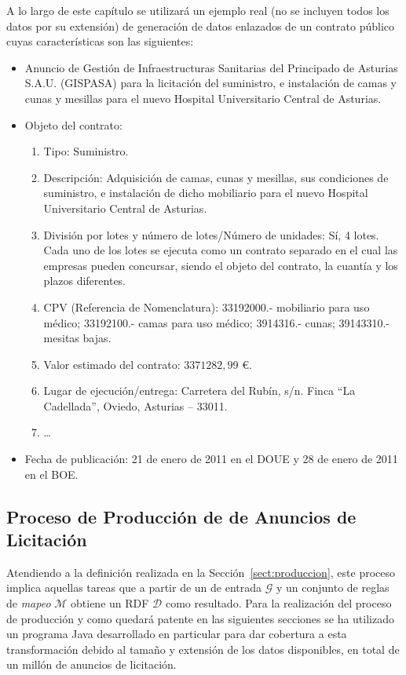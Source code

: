 A lo largo de este capítulo se utilizará un ejemplo real (no se incluyen todos los datos por su extensión) de generación de datos enlazados 
de un contrato público cuyas características son las siguientes:
\begin{itemize}
 \item Anuncio de Gestión de Infraestructuras Sanitarias del Principado de Asturias S.A.U. (GISPASA) para la licitación del suministro, e
instalación de camas y cunas y mesillas para el nuevo Hospital Universitario Central de Asturias.
\item Objeto del contrato:
\begin{enumerate}
 \item Tipo: Suministro.
 \item Descripción: Adquisición de camas, cunas y mesillas, sus condiciones de
suministro, e instalación de dicho mobiliario para el nuevo Hospital
Universitario Central de Asturias.
 \item División por lotes y número de lotes/Número de unidades: Sí, 4 lotes. Cada uno de los lotes se ejecuta 
como un contrato separado en el cual las empresas pueden concursar, siendo el objeto del contrato, la cuantía 
y los plazos diferentes.
 \item  CPV (Referencia de Nomenclatura): 33192000.- mobiliario para uso médico;
33192100.- camas para uso médico; 3914316.- cunas; 39143310.- mesitas bajas.
\item Valor estimado del contrato: $3371282,99$ \euro.
\item Lugar de ejecución/entrega: Carretera del Rubín, s/n. Finca ``La Cadellada'', Oviedo, Asturias – 33011.
\item \ldots
\end{enumerate}

\item Fecha de publicación: 21 de enero de 2011 en el \gls{DOUE} y 28 de enero de 2011 en el \gls{BOE}.

\end{itemize}


\subsection{Proceso de Producción de \linkeddata de Anuncios de Licitación}
Atendiendo a la definición realizada en la Sección~\ref{sect:produccion}, este proceso 
implica aquellas tareas que a partir de un \dataset de entrada $\mathcal{G}$ y un conjunto 
de reglas de \textit{mapeo} $\mathcal{M}$ obtiene un \dataset \gls{RDF} $\mathcal{D}$ como resultado. Para la realización 
del proceso de producción y como quedará patente en las siguientes secciones se ha utilizado un programa 
Java desarrollado en particular para dar cobertura a esta transformación debido al tamaño y extensión 
de los datos disponibles, en total de un millón de anuncios de licitación.

